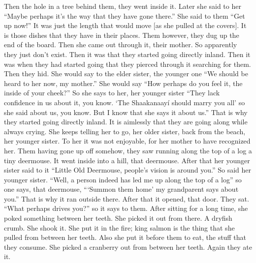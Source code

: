 \begin{pairs}
\begin{Rightside}
Then the hole in a tree behind them, they went inside it.
\pend
\pstart
{}Later she said to her
\qqk{}“Maybe perhaps it’s the way that they have gone there.”
She said to them
\qqk{}“Get up now!”
It was just the length that would move [as she pulled at the covers].
It is those dishes that they have in their places.
Them however, they dug up the end of the board.
Then she came out through it, their mother.
So apparently they just don’t exist.
Then it was that they started going directly inland.
Then it was when they had started going that they pierced through it searching for them.
Then they hid.
She would say to the elder sister, the younger one
\qqk{}“We should be heard to her now, my mother.”
She would say
“How perhaps do you feel it, the inside of your cheek?”
So she says to her, her younger sister
\qqk{}“They lack confidence in us about it, you know.
\qqk{}‘The Shaakanaayí should marry you all’
so she said about us, you know.
But I know that she says it about us.”
\pend
\pstart
{}That is why they started going directly inland.
It is aimlessly that they are going along while always crying.
She keeps telling her to go, her older sister, back from the beach, her younger sister.
To her it was not enjoyable, for her mother to have recognized her.
Them having gone up off somehow, they saw running along the top of a log a tiny deermouse.
It went inside into a hill, that deermouse.
After that her younger sister said to it
\qqk{}“Little Old Deermouse, people’s vision is around you.”
So said her younger sister.
\qqk{}“Well, a person indeed has led me up along the top of a log”
so one says, that deermouse,
\qqk{}“‘Summon them home’ my grandparent says about you.”
That is why it ran outside there.
After that it opened, that door.
They sat.
\qqk{}“What perhaps drives you?”
so it says to them.
After sitting for a long time, she poked something between her teeth.
She picked it out from there.
A dryfish crumb.
She shook it.
She put it in the fire;
king salmon is the thing that she pulled from between her teeth.
Also she put it before them to eat, the stuff that they consume.
She picked a cranberry out from between her teeth.
Again they ate it.

\end{Rightside}
\end{pairs}

